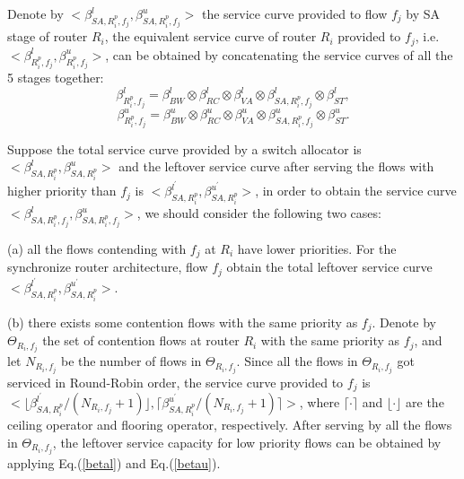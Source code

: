 \documentclass[10pt,journal]{IEEEtran}
\begin{document}
Denote by $<\beta_{SA,R_i^{p},f_j}^l,\beta_{SA,R_i^{p},f_j}^u>$ the service curve provided to flow $f_j$ by SA stage of router $R_i$, the equivalent service curve of router $R_i$ provided to $f_j$, i.e. $<\beta_{R_i^{p},f_j}^l,\beta_{R_i^{p},f_j}^u>$, can be obtained by concatenating the service curves of all the 5 stages together:
$$\beta_{R_i^{p},f_j}^l=\beta_{BW}^l\otimes\beta_{RC}^l\otimes\beta_{VA}^l\otimes\beta_{SA,R_i^{p},f_j}^l\otimes \beta_{ST}^l,$$
$$\beta_{R_i^{p},f_j}^u=\beta_{BW}^u\otimes\beta_{RC}^u\otimes\beta_{VA}^u\otimes\beta_{SA,R_i^{p},f_j}^u\otimes \beta_{ST}^u.$$

Suppose the total service curve provided by a switch allocator is $<\beta_{SA,R_i^{p}}^l,\beta_{SA,R_i^{p}}^u>$ and the leftover service curve after serving the flows with higher priority than $f_j$ is $<\beta_{SA,R_i^{p}}^{l^\prime},\beta_{SA,R_i^{p}}^{u^\prime}>$, in order to obtain the service curve $<\beta_{SA,R_i^{p},f_j}^l,\beta_{SA,R_i^{p},f_j}^u>$, we should consider the following two cases:

(a) all the flows contending with $f_j$ at $R_i$ have lower priorities. For the synchronize router architecture, flow $f_j$ obtain the total leftover service curve $<\beta_{SA,R_i^{p}}^{l^\prime},\beta_{SA,R_i^{p}}^{u^\prime}>$.

(b) there exists some contention flows with the same priority as $f_j$. Denote by $\Theta_{R_i,f_j}$ the set of contention flows at router $R_i$ with the same priority as $f_j$, and let $N_{R_i,f_j}$ be the number of flows in $\Theta_{R_i,f_j}$. Since all the flows in $\Theta_{R_i,f_j}$ got serviced in Round-Robin order, the service curve provided to $f_j$ is $<\lfloor\beta^{l^\prime}_{SA,R_i^{p}}/(N_{R_i,f_j}+1)\rfloor,\lceil\beta^{u^\prime}_{SA,R_i^{p}}/(N_{R_i,f_j}+1)\rceil>$, where $\lceil\cdot\rceil$ and $\lfloor\cdot\rfloor$ are the ceiling operator and flooring operator, respectively. After serving by all the flows in $\Theta_{R_i,f_j}$, the leftover service capacity for low priority flows can be obtained by applying Eq.(\ref{betal}) and Eq.(\ref{betau}).
\end{document}
